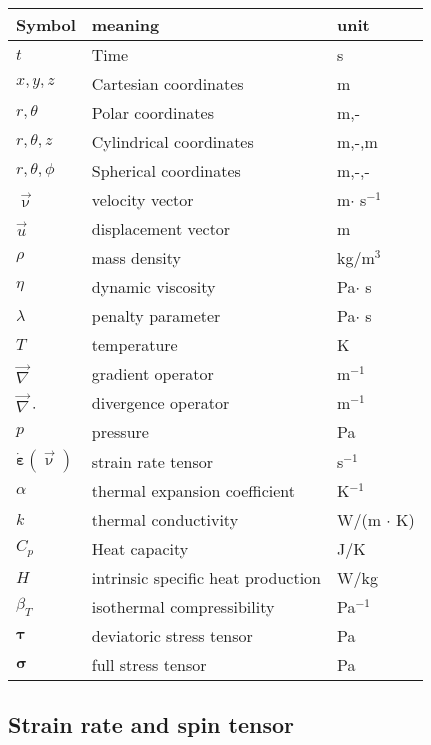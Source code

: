 
\begin{center}
\begin{tabular}{lll}
\hline
Symbol & meaning & unit \\
\hline
\hline
$t$ & Time & s \\
$x,y,z$ & Cartesian coordinates & m \\
$r,\theta$ & Polar coordinates & m,-\\
$r,\theta, z$ & Cylindrical coordinates & m,-,m\\
$r,\theta,\phi$ & Spherical coordinates & m,-,- \\
${\vec \upnu}$ & velocity vector & m$\cdot$ s$^{-1}$\\
${\vec u}$ & displacement vector & m \\
$\rho$ & mass density & kg/m$^3$ \\
$\eta$ & dynamic viscosity &  Pa$\cdot$ s \\
$\lambda$ & penalty parameter & Pa$\cdot$ s \\
$T$ & temperature & K \\
${\vec \nabla}$ & gradient operator & m$^{-1}$ \\
${\vec \nabla}\cdot$ & divergence operator & m$^{-1}$ \\
$p$ & pressure & Pa\\
$\dot{\bm \varepsilon}({\vec \upnu})$ & strain rate tensor & s$^{-1}$ \\
$\alpha$ & thermal expansion coefficient & K$^{-1}$ \\
$k$ & thermal conductivity & W/(m $\cdot$ K) \\
$C_p$ & Heat capacity & J/K \\
$H$ & intrinsic specific heat production & W/kg\\
$\beta_T$ & isothermal compressibility & Pa$^{-1}$  \\
${\bm \tau}$ & deviatoric stress tensor & Pa \\
${\bm \sigma}$ & full stress tensor & Pa \\
\hline
\end{tabular}
\end{center}

\subsection{Strain rate and spin tensor}


